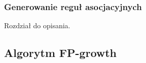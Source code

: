 \subsubsection{Generowanie reguł asocjacyjnych}
Rozdział do opisania.

\subsection{Algorytm FP-growth}







